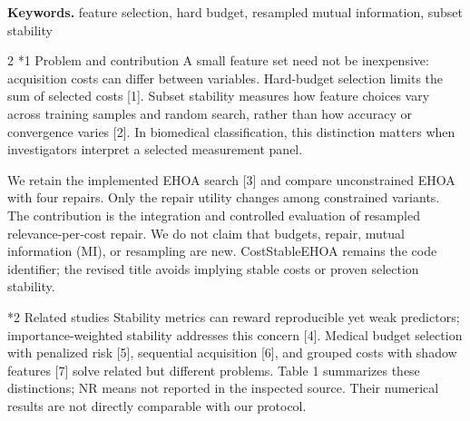 \documentclass[10pt,a4paper]{article}
\makeatletter
\renewcommand{\section}{\@startsection{section}{1}{0pt}{5pt}{2pt}{\normalfont\normalsize\bfseries}}
\newcommand{\sect}[1]{\section*{#1}}
\makeatother
\begin{document}
\textbf{Keywords. } feature selection, hard budget, resampled mutual information, subset stability
\begin{multicols}{2}\raggedcolumns
\sect{1  Problem and contribution}
A small feature set need not be inexpensive: acquisition costs can differ between variables. Hard-budget selection limits the sum of selected costs [1]. Subset stability measures how feature choices vary across training samples and random search, rather than how accuracy or convergence varies [2]. In biomedical classification, this distinction matters when investigators interpret a selected measurement panel.

We retain the implemented EHOA search [3] and compare unconstrained EHOA with four repairs. Only the repair utility changes among constrained variants. The contribution is the integration and controlled evaluation of resampled relevance-per-cost repair. We do not claim that budgets, repair, mutual information (MI), or resampling are new. CostStableEHOA remains the code identifier; the revised title avoids implying stable costs or proven selection stability.

\sect{2  Related studies}
Stability metrics can reward reproducible yet weak predictors; importance-weighted stability addresses this concern [4]. Medical budget selection with penalized risk [5], sequential acquisition [6], and grouped costs with shadow features [7] solve related but different problems. Table 1 summarizes these distinctions; NR means not reported in the inspected source. Their numerical results are not directly comparable with our protocol.


\end{multicols}
\end{document}
